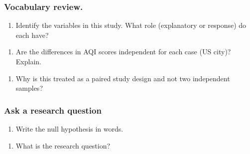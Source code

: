 \documentclass[
]{report}
\providecommand{\tightlist}{%
  \setlength{\itemsep}{0pt}\setlength{\parskip}{0pt}}
\begin{document}
\newpage

\hypertarget{vocabulary-review.}{%
\subsubsection*{Vocabulary review.}\label{vocabulary-review.}}

\begin{enumerate}
\def\labelenumi{\arabic{enumi}.}
\tightlist
\item
  Identify the variables in this study. What role (explanatory or response) do each have?
\end{enumerate}

\vspace{.5in}

\begin{enumerate}
\def\labelenumi{\arabic{enumi}.}
\setcounter{enumi}{1}
\tightlist
\item
  Are the differences in AQI scores independent for each case (US city)? Explain.
\end{enumerate}

\vspace{0.5in}

\begin{enumerate}
\def\labelenumi{\arabic{enumi}.}
\setcounter{enumi}{2}
\tightlist
\item
  Why is this treated as a paired study design and not two independent samples?
\end{enumerate}

\vspace{0.5in}

\hypertarget{ask-a-research-question-2}{%
\subsubsection*{Ask a research question}\label{ask-a-research-question-2}}

\begin{enumerate}
\def\labelenumi{\arabic{enumi}.}
\setcounter{enumi}{3}
\tightlist
\item
  Write the null hypothesis in words.
\end{enumerate}

\vspace{0.8in}

\begin{enumerate}
\def\labelenumi{\arabic{enumi}.}
\setcounter{enumi}{4}
\tightlist
\item
  What is the research question?
\end{enumerate}
\end{document}
